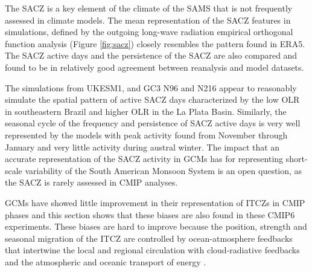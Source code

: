 
 The SACZ is a key element of the climate of the SAMS \citep{carvalho2004,jorgetti2014,van2015dynamical,zilli2019} that is not frequently assessed in climate models.  
 The mean representation of the SACZ features in  simulations, defined by the outgoing long-wave radiation empirical orthogonal function analysis (Figure \ref{fig:sacz}) closely resembles the pattern found in ERA5. The SACZ active days and the persistence of the SACZ are also compared and found to be in relatively good agreement between reanalysis and model datasets.
 
The simulations from UKESM1, and GC3 N96 and N216 appear to reasonably simulate the spatial pattern of active SACZ days characterized by the low OLR in southeastern Brazil and higher OLR in the La Plata Basin. Similarly, the seasonal cycle of the frequency and persistence of SACZ active days is very well represented by the models with peak activity found from November through January and very little activity during austral winter. The impact that an accurate representation of the SACZ activity in GCMs has for representing short-scale variability of the South American Monsoon System is an open question, as the SACZ is rarely assessed in CMIP analyses.

GCMs have showed little improvement in their representation of ITCZs in CMIP phases\citep{oueslati2015} and this section shows that these biases are also found in these CMIP6 experiments. These biases are hard to improve because the position, strength and seasonal migration of the ITCZ are controlled by ocean-atmosphere feedbacks that intertwine the local and regional circulation with cloud-radiative feedbacks and the atmospheric and oceanic transport of energy \citep{schneider2014,oueslati2015,byrne2016,byrne2020}. 


